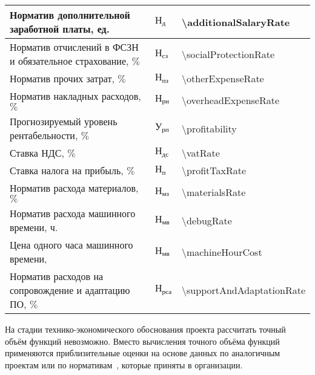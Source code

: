 \begin{longtable}[l]{| >{\raggedright}m{}
                     | >{\centering}m{}
                     | >{\centering\arraybackslash}m{}|}
    Норматив дополнительной заработной платы, ед.
    & $ \text{Н}_\text{д} $ & \num{\additionalSalaryRate}
    \\ \hline

    Норматив отчислений в ФСЗН и обязательное страхование, $\%$
    & $ \text{Н}_\text{сз} $ & \num{\socialProtectionRate}
    \\ \hline

    Норматив прочих затрат, $\%$
    & $ \text{Н}_\text{пз} $ & \num{\otherExpenseRate}
    \\ \hline

    Норматив накладных расходов, $\%$
    & $ \text{Н}_\text{рн} $ & \num{\overheadExpenseRate}
    \\ \hline

    Прогнозируемый уровень рентабельности,
    $\%$ & $ \text{У}_\text{рп} $ & \num{\profitability}
    \\ \hline

    Ставка НДС, $\%$
    & $ \text{Н}_\text{дс} $ & \num{\vatRate}
    \\ \hline

    Ставка налога на прибыль, $\%$
    & $ \text{Н}_\text{п} $ & \num{\profitTaxRate}
    \\ \hline

    Норматив расхода материалов, $\%$
    & $ \text{Н}_\text{мз} $ & \num{\materialsRate}
    \\ \hline

    Норматив расхода машинного времени, ч.
    & $ \text{Н}_\text{мв} $ & \num{\debugRate}
    \\ \hline

    Цена одного часа машинного времени, \byr{}
    & $ \text{Н}_\text{мв} $ & \num{\machineHourCost}
    \\ \hline

    Норматив расходов на сопровождение и адаптацию ПО, $\%$
    & $ \text{Н}_\text{рса} $ & \num{\supportAndAdaptationRate}
    \\ \hline
\end{longtable}


На стадии технико-экономического обоснования проекта рассчитать точный объём функций невозможно.
Вместо вычисления точного объёма функций применяются приблизительные оценки на основе данных по аналогичным проектам или по нормативам~\cite[с.~61,~приложение 2]{palicyn_2006}, которые приняты в организации.

\def \totalLOC{13940} %
\def \totalLOCCorrected{6300} %

